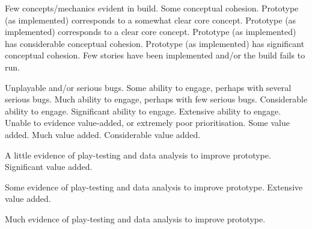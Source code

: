 \documentclass{../../fal_assignment}
\begin{document}
\begin{markingrubric}
%
        \grade \fail Few concepts/mechanics evident in build.
        \grade Some conceptual cohesion.
        \grade Prototype (as implemented) corresponds to a somewhat clear core concept.
        \grade Prototype (as implemented) corresponds to a clear core concept.
        \grade Prototype (as implemented) has considerable conceptual cohesion.
        \grade Prototype (as implemented) has significant conceptual cohesion.
%
        \grade \fail Few stories have been implemented and/or the build fails to run.
            \par Unplayable and/or serious bugs.
        \grade Some ability to engage, perhaps with several serious bugs.
        \grade Much ability to engage, perhaps with few serious bugs.
        \grade Considerable ability to engage.
        \grade Significant ability to engage.
        \grade Extensive ability to engage.
%
        \grade \fail Unable to evidence value-added, or extremely poor prioritisation.
        \grade Some value added.
        \grade Much value added.
        \grade Considerable value added.
            \par A little evidence of play-testing and data analysis to improve prototype.
        \grade Significant value added.
            \par Some evidence of play-testing and data analysis to improve prototype.
        \grade Extensive value added.
            \par Much evidence of play-testing and data analysis to improve prototype. 
%
\end{markingrubric}
\end{document}
